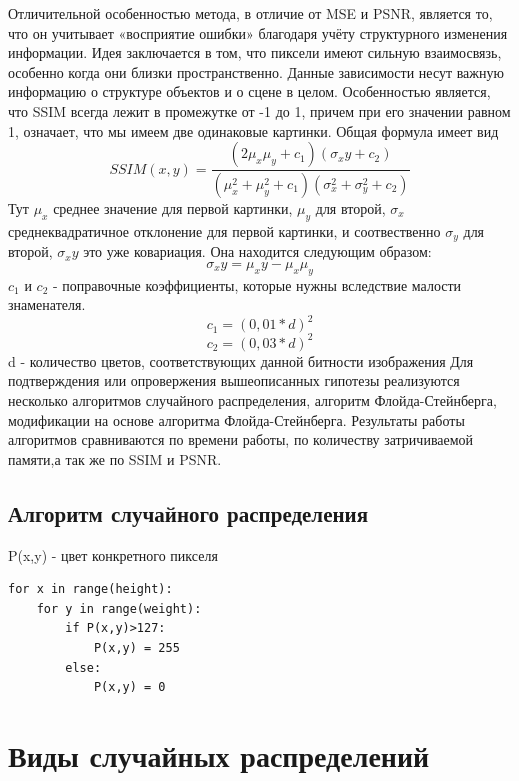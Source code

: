 Отличительной особенностью метода, в отличие от MSE и PSNR, является то, что он учитывает «восприятие ошибки» благодаря учёту структурного изменения информации. Идея заключается в том, что пиксели имеют сильную взаимосвязь, особенно когда они близки пространственно. Данные зависимости несут важную информацию о структуре объектов и о сцене в целом.
Особенностью является, что SSIM всегда лежит в промежутке от -1 до 1, причем при его значении равном 1, означает, что мы имеем две одинаковые картинки. Общая формула имеет вид
\begin{equation}
SSIM(x,y) = \frac{(2\mu_x\mu_y +c_1)(\sigma_xy+c_2)}{(\mu^2_x+\mu^2_y+c_1)(\sigma^2_x+\sigma^2_y+c_2)}
\label{F:F3}
\end{equation}
Тут $\mu_x$ среднее значение для первой картинки, $\mu_y$  для второй, $\sigma_x$ среднеквадратичное отклонение для первой картинки, и соотвественно $\sigma_y$ для второй, $\sigma_xy$ это уже ковариация. Она находится следующим образом:
\begin{equation}
\sigma_xy = \mu_xy - \mu_x\mu_y
\label{F:F4}
\end{equation} 
$c_1$ и $c_2$ -  поправочные коэффициенты, которые нужны вследствие малости знаменателя.
\begin{equation}
c_1= (0,01*d)^2 
\label{F:F5} 
\end{equation}
\begin{equation}
c_2=(0,03*d)^2
\label{F:F6}
\end{equation}  
d - количество цветов, соответствующих данной битности изображения 
Для подтверждения или опровержения вышеописанных гипотезы реализуются несколько алгоритмов случайного распределения, алгоритм Флойда-Стейнберга, модификации на основе алгоритма Флойда-Стейнберга. Результаты работы алгоритмов сравниваются по времени работы, по количеству затричиваемой памяти,а так же по SSIM и PSNR.
\subsection{Алгоритм случайного распределения} 
P(x,y)  - цвет конкретного пикселя
\begin{lstlisting}[style=pseudocode,caption={Алгоритм случайного распределения}] 
for x in range(height):
    for y in range(weight):
        if P(x,y)>127:
            P(x,y) = 255
        else:
            P(x,y) = 0
\end{lstlisting}

\section{Виды случайных распределений} 
